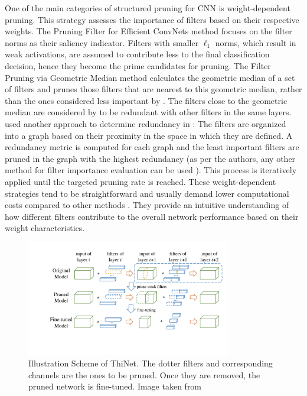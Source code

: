 One of the main categories of structured pruning for \ac{CNN} is
weight-dependent pruning. This strategy assesses the importance of filters based
on their respective weights. The Pruning Filter for Efficient ConvNets method
\cite{DBLP:conf/iclr/0022KDSG17} focuses on the filter norms as their saliency
indicator. Filters with smaller $\ell_1$ norms, which result in weak
activations, are assumed to contribute less to the final classification
decision, hence they become the prime candidates for pruning.  The Filter
Pruning via Geometric Median method \cite{DBLP:conf/cvpr/HeLWHY19} calculates
the geometric median of a set of filters and prunes those filters that are
nearest to this geometric median, rather than the ones considered less important
by \cite{DBLP:conf/iclr/0022KDSG17}. The filters close to the geometric median
are considered by \citeauthor{DBLP:conf/cvpr/HeLWHY19} to be redundant with
other filters in the same layers. \citeauthor{DBLP:conf/cvpr/WangLW21} used
another approach to determine redundancy in \cite{DBLP:conf/cvpr/WangLW21}: The
filters are organized into a graph based on their proximity in the space in
which they are defined. A redundancy metric is computed for each graph and the
least important filters are pruned in the graph with the highest redundancy (as
per the authors, any other method for filter importance evaluation can be used
\cite{DBLP:conf/iclr/0022KDSG17,DBLP:journals/access/PolyakW15,DBLP:conf/iclr/MolchanovTKAK17}).
This process is iteratively applied until the targeted pruning rate is reached.
These weight-dependent strategies tend to be straightforward and usually demand
lower computational costs compared to other methods
\cite{DBLP:journals/corr/abs-2303-00566}. They provide an intuitive
understanding of how different filters contribute to the overall network
performance based on their weight characteristics. \\


\begin{figure}[htbp]
    \centering
    \includegraphics[width=0.8\textwidth]{chapter_sota/assets/thinet.pdf}
    \caption{Illustration Scheme of ThiNet. The dotter filters and corresponding
    channels are the ones to be pruned. Once they are removed, the pruned network
    is fine-tuned. Image taken from \cite{DBLP:conf/iccv/LuoWL17}}
    \label{fig:sota:thinet}
\end{figure}

